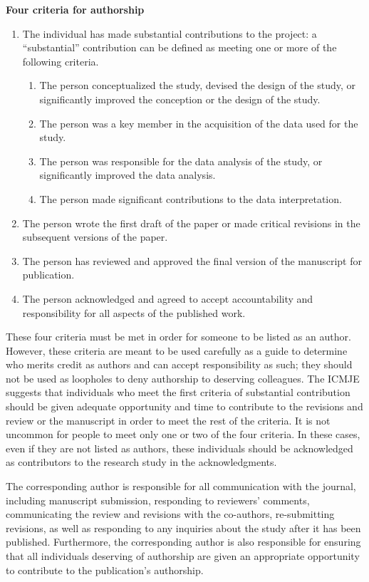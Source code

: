 \documentclass[
]{book}
\providecommand{\tightlist}{%
  \setlength{\itemsep}{0pt}\setlength{\parskip}{0pt}}
\begin{document}
\textbf{Four criteria for authorship}

\begin{enumerate}
\def\labelenumi{\arabic{enumi}.}
\item
  The individual has made substantial contributions to the project: a ``substantial'' contribution can be defined as meeting one or more of the following criteria.

  \begin{enumerate}
  \def\labelenumii{\alph{enumii}.}
  \tightlist
  \item
    The person conceptualized the study, devised the design of the study, or significantly improved the conception or the design of the study.
  \item
    The person was a key member in the acquisition of the data used for the study.
  \item
    The person was responsible for the data analysis of the study, or significantly improved the data analysis.
  \item
    The person made significant contributions to the data interpretation.
  \end{enumerate}
\item
  The person wrote the first draft of the paper or made critical revisions in the subsequent versions of the paper.
\item
  The person has reviewed and approved the final version of the manuscript for publication.
\item
  The person acknowledged and agreed to accept accountability and responsibility for all aspects of the published work.
\end{enumerate}

These four criteria must be met in order for someone to be listed as an author. However, these criteria are meant to be used carefully as a guide to determine who merits credit as authors and can accept responsibility as such; they should not be used as loopholes to deny authorship to deserving colleagues. The ICMJE suggests that individuals who meet the first criteria of substantial contribution should be given adequate opportunity and time to contribute to the revisions and review or the manuscript in order to meet the rest of the criteria. It is not uncommon for people to meet only one or two of the four criteria. In these cases, even if they are not listed as authors, these individuals should be acknowledged as contributors to the research study in the acknowledgments.

The corresponding author is responsible for all communication with the journal, including manuscript submission, responding to reviewers' comments, communicating the review and revisions with the co-authors, re-submitting revisions, as well as responding to any inquiries about the study after it has been published. Furthermore, the corresponding author is also responsible for ensuring that all individuals deserving of authorship are given an appropriate opportunity to contribute to the publication's authorship.
\end{document}

